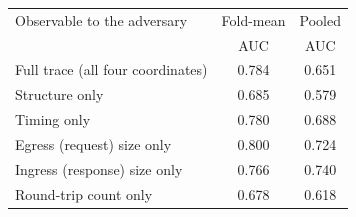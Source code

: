 {\setlength{\tabcolsep}{5pt}\renewcommand{\arraystretch}{1.15}
\begin{tabular}{@{}lcc@{}}
\toprule
Observable to the adversary & Fold-mean & Pooled \\
                            & AUC       & AUC    \\
\midrule
Full trace (all four coordinates) & 0.784 & 0.651 \\
Structure only & 0.685 & 0.579 \\
Timing only & 0.780 & 0.688 \\
Egress (request) size only & 0.800 & 0.724 \\
Ingress (response) size only & 0.766 & 0.740 \\
Round-trip count only & 0.678 & 0.618 \\
\bottomrule
\end{tabular}}
